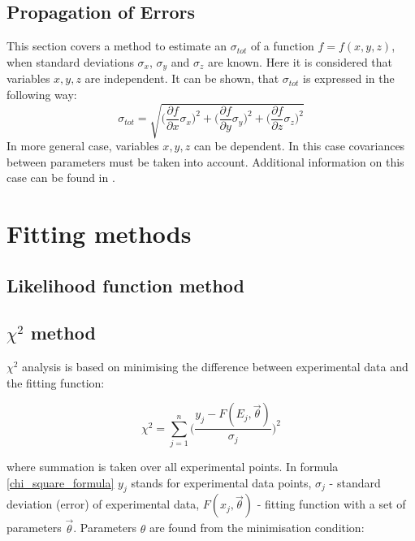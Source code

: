 \documentclass[12pt,a4paper]{report}
\begin{document}
\subsection{Propagation of Errors} \label{error_analysis}
This section covers a method to estimate an $\sigma_{tot}$ of a function $f=f(x,y,z)$, when standard deviations $\sigma_x$, $\sigma_y$ and $\sigma_z$ are known. Here it is considered that variables $x, y, z$ are independent. It can be shown, that $\sigma_{tot}$ is expressed in the following way:
\begin{equation} \label{error_propagation}
\sigma_{tot} = \sqrt{\Big ( \frac{\partial f}{\partial x} \sigma_x \Big )^2+\Big ( \frac{\partial f}{\partial y} \sigma_y \Big )^2+\Big ( \frac{\partial f}{\partial z} \sigma_z \Big )^2}
\end{equation} 
In more general case, variables $x, y, z$ can be dependent. In this case covariances between parameters must be taken into account. Additional information on this case can be found in \cite{stat_1, stat_2, stat_3}.
 

\section{Fitting methods}
\subsection{Likelihood function method}

\subsection{$\chi^2$ method}

$\chi^2$ analysis \cite{stat_2, BAKER1984437, reduced_chi_squared} is based on minimising the difference between experimental data and the fitting function:

\begin{equation} \label{chi_square_formula}
\chi^2 = \sum_{j = 1}^{n} \Big ( \frac{y_j - F(E_j,\vec{\theta})}{\sigma_j} \Big )^2 
\end{equation}

where summation is taken over all experimental points. In formula \ref{chi_square_formula} $y_j$ stands for experimental data points, $\sigma_j$ - standard deviation (error) of experimental data, $F(x_j,\vec{\theta})$ - fitting function with a set of parameters $\vec{\theta}$. Parameters $\theta$ are found from the minimisation condition:
\end{document}
